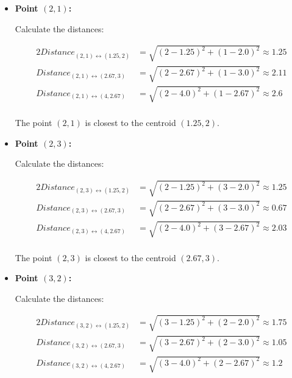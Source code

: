 \documentclass[
english,
smallborders
]{i6prcsht}
\begin{document}
\begin{solution}
\begin{enumerate}
\begin{itemize}
			      \item \textbf{Point $(2,1)$:}

			            Calculate the distances:

			            \begin{alignat*}{2}
				            Distance_{(2,1)\leftrightarrow(1.25,2)} & = \sqrt{(2-1.25)^2+(1-2.0)^2} \approx 1.25 \\
				            Distance_{(2,1)\leftrightarrow(2.67,3)} & = \sqrt{(2-2.67)^2+(1-3.0)^2} \approx 2.11 \\
				            Distance_{(2,1)\leftrightarrow(4,2.67)} & = \sqrt{(2-4.0)^2+(1-2.67)^2} \approx 2.6  \\
			            \end{alignat*}

			            The point $(2,1)$ is closest to the centroid $(1.25,2)$.

			      \item \textbf{Point $(2,3)$:}

			            Calculate the distances:

			            \begin{alignat*}{2}
				            Distance_{(2,3)\leftrightarrow(1.25,2)} & = \sqrt{(2-1.25)^2+(3-2.0)^2} \approx 1.25 \\
				            Distance_{(2,3)\leftrightarrow(2.67,3)} & = \sqrt{(2-2.67)^2+(3-3.0)^2} \approx 0.67 \\
				            Distance_{(2,3)\leftrightarrow(4,2.67)} & = \sqrt{(2-4.0)^2+(3-2.67)^2} \approx 2.03 \\
			            \end{alignat*}

			            The point $(2,3)$ is closest to the centroid $(2.67,3)$.

			      \item \textbf{Point $(3,2)$:}

			            Calculate the distances:

			            \begin{alignat*}{2}
				            Distance_{(3,2)\leftrightarrow(1.25,2)} & = \sqrt{(3-1.25)^2+(2-2.0)^2} \approx 1.75 \\
				            Distance_{(3,2)\leftrightarrow(2.67,3)} & = \sqrt{(3-2.67)^2+(2-3.0)^2} \approx 1.05 \\
				            Distance_{(3,2)\leftrightarrow(4,2.67)} & = \sqrt{(3-4.0)^2+(2-2.67)^2} \approx 1.2  \\
			            \end{alignat*}


\end{itemize}
\end{enumerate}
\end{solution}
\end{document}
